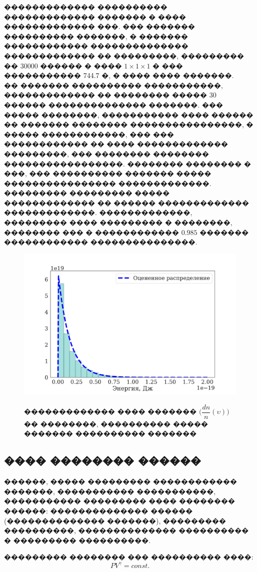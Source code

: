 ������������� ���������� ������������� ������� � ���� ������������� ���. ��� ������� ���������� �������, � ������� ������������ �������������� ������������� �� ���������, ��������� �� 30000 ������ � ���� $1 \times 1 \times 1$ � ��� ����������� 744.7 �, � ���� ���� �������.\\
\indent �� ������� ���������� �����������, ������������� �� �������� ����� 30 ������ �������������� �������. ��� ����� ��������, ����������� ���� ������ �� ������� �������� ����������������, � ����� ������������, ��� ��� ������������ �� ���� ������������� ���������, ���
�������� �������� �����������������. �������� �������� � ���, ��� ���������� ������� ����� ���������������� �������������. ��������� ��������� ����� �������������
�� ������ ������������� �������������. �������������, ��������� ���� ��������� � ��������, �������� ��� � ������������ $0.985$ ������� ������������ ���������������.

\begin{figure}[!h]
{\includegraphics[width=1\linewidth]{hist_E}}
    \caption{������������� ���� ������� $\Big(\dfrac{dn}{n} (\upsilon) \Big)$ �� ��������, ���������� ����� ������� ���������� �������}
\end{figure}

\subsection{���� �������� ������}
������, ����� ��������� ������������ �������, ����������� �����������, ����������� ��������� ���� �������� ������:
�������������� ������ (�������������� �������), ��������� ����������, �������������� ���������� � ��������� ����������.

��������� �������� ��� ���������� ����:
\[PV^\gamma = const. \]

